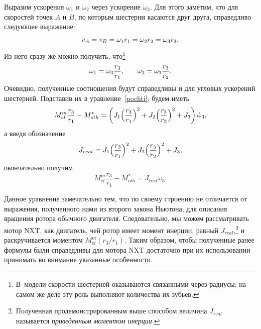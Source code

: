 \documentclass[12pt, a4paper, openany]{extarticle}
\begin{document}
Выразим ускорения $\dot\omega_1$ и $\dot\omega_2$ через ускорение $\dot\omega_3$.
Для этого заметим, что для скоростей точек $A$ и $B$, по которым шестерни касаются друг друга, справедливо следующее выражение:
\begin{equation}\label{VaVb}
	v_A = v_B = \omega_1r_1 = \omega_2r_2 = \omega_3r_3\ldotp
\end{equation}
Из него сразу же можно получить, что\footnote{В~модели скорости шестерней оказываются связанными через радиусы; на самом же деле эту роль выполняют количества их зубьев.}
\begin{align}\label{w&ws}
	&\omega_1 = \omega_3\frac{r_3}{r_1}, && &\omega_2 = \omega_3\frac{r_3}{r_2}\ldotp
\end{align}
Очевидно, полученные соотношения будут справедливы и для угловых ускорений шестерней.
Подставив их в уравнение~\eqref{pochti}, будем иметь
\begin{equation}
	M_{el}^m\frac{r_3}{r_1} - M_{oth}^* = \left(J_1\Bigl(\frac{r_3}{r_1}\Bigr)^2 + J_2\Bigl(\frac{r_3}{r_2}\Bigr)^2 +
	 J_3\right)\dot\omega_3,
\end{equation} 
а введя обозначение 
\begin{equation}\label{Jreal}
	J_{real} = J_1\Bigl(\frac{r_3}{r_1}\Bigr)^2 + J_2\Bigl(\frac{r_3}{r_2}\Bigr)^2 + J_3,
\end{equation} 
окончательно получим
\begin{equation}\label{final}
	M_{el}^m\frac{r_3}{r_1} - M_{oth}^* = J_{real}\dot\omega_3.
\end{equation} 

Данное уравнение замечательно тем, что по своему строению не отличается от выражения, полученного нами из второго закона Ньютона, для описания вращения ротора обычного двигателя.
Следовательно, мы можем рассматривать мотор NXT, как двигатель, чей ротор имеет момент инерции, равный $J_{real}$\lefteqn,\footnote{Полученная продемонстрированным выше способом величина $J_{real}$ называется \textit{приведенным моментом инерции}.} и раскручивается моментом $M_{el}^m(r_3/r_1)$.
Таким образом, чтобы полученные ранее формулы были справедливы для мотора NXT достаточно при их использовании принимать во внимание указанные особенности.
\end{document}
